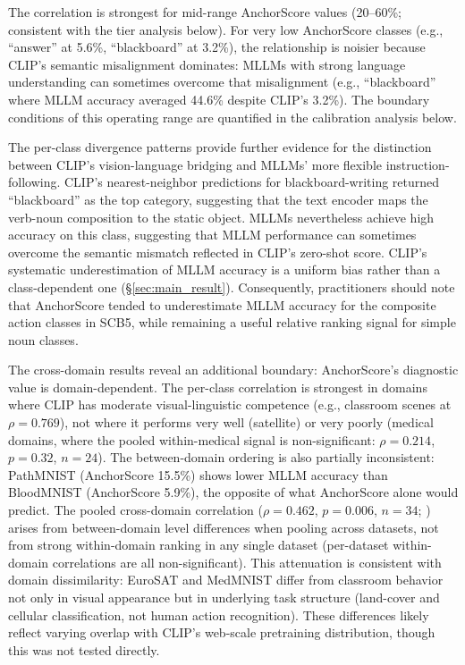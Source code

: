 \documentclass[a4paper,fleqn]{cas-sc}
\begin{document}
The correlation is strongest for mid-range AnchorScore values (20--60\%; consistent with the tier analysis below). For very low AnchorScore classes (e.g., ``answer'' at 5.6\%, ``blackboard'' at 3.2\%), the relationship is noisier because CLIP's semantic misalignment dominates: MLLMs with strong language understanding can sometimes overcome that misalignment (e.g., ``blackboard'' where MLLM accuracy averaged 44.6\% despite CLIP's 3.2\%). The boundary conditions of this operating range are quantified in the calibration analysis below.

The per-class divergence patterns provide further evidence for the distinction between CLIP's vision-language bridging and MLLMs' more flexible instruction-following. CLIP's nearest-neighbor predictions for blackboard-writing returned ``blackboard'' as the top category, suggesting that the text encoder maps the verb-noun composition to the static object. MLLMs nevertheless achieve high accuracy on this class, suggesting that MLLM performance can sometimes overcome the semantic mismatch reflected in CLIP's zero-shot score. CLIP's systematic underestimation of MLLM accuracy is a uniform bias rather than a class-dependent one (\S\ref{sec:main_result}). Consequently, practitioners should note that AnchorScore tended to underestimate MLLM accuracy for the composite action classes in SCB5, while remaining a useful relative ranking signal for simple noun classes.

The cross-domain results reveal an additional boundary: AnchorScore's diagnostic value is domain-dependent. The per-class correlation is strongest in domains where CLIP has moderate visual-linguistic competence (e.g., classroom scenes at $\rho=0.769$), not where it performs very well (satellite) or very poorly (medical domains, where the pooled within-medical signal is non-significant: $\rho=0.214$, $p=0.32$, $n=24$). The between-domain ordering is also partially inconsistent: PathMNIST (AnchorScore 15.5\%) shows lower MLLM accuracy than BloodMNIST (AnchorScore 5.9\%), the opposite of what AnchorScore alone would predict. The pooled cross-domain correlation ($\rho=0.462$, $p=0.006$, $n=34$; ) arises from between-domain level differences when pooling across datasets, not from strong within-domain ranking in any single dataset (per-dataset within-domain correlations are all non-significant). This attenuation is consistent with domain dissimilarity: EuroSAT and MedMNIST differ from classroom behavior not only in visual appearance but in underlying task structure (land-cover and cellular classification, not human action recognition). These differences likely reflect varying overlap with CLIP's web-scale pretraining distribution, though this was not tested directly.
\end{document}
